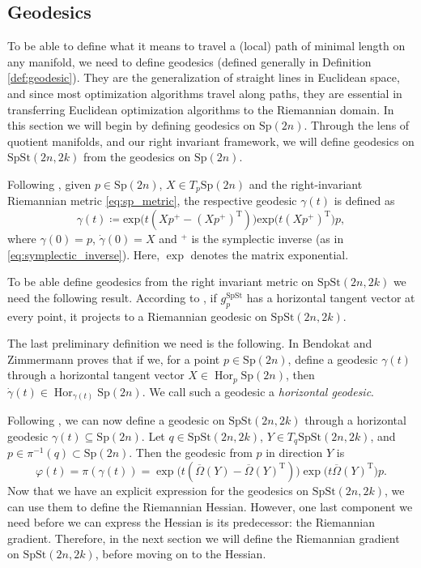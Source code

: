 \subsection{Geodesics}
To be able to define what it means to travel a (local) path of minimal length on any manifold, we need to define geodesics (defined generally in Definition \ref{def:geodesic}). They are the generalization of straight lines in Euclidean space, and since most optimization algorithms travel along paths, they are essential in transferring Euclidean optimization algorithms to the Riemannian domain. In this section we will begin by defining geodesics on $\mathrm{Sp}(2n)$. Through the lens of quotient manifolds, and our right invariant framework, we will define geodesics on $\mathrm{SpSt}(2n, 2k)$ from the geodesics on $\mathrm{Sp}(2n)$.

Following \cite[Prop.~2.1]{BendokatZimmermann2021}, given $p\in \mathrm{Sp}(2n)$,  $X\in T_{p}\mathrm{Sp}(2n)$ and the right-invariant Riemannian metric \eqref{eq:sp_metric}, the respective geodesic $\gamma(t)$ is defined as
\begin{equation*}
    \gamma(t)\coloneqq \mathrm{exp}\big(t(Xp^{+}-(Xp^{+}) ^{\mathrm{T}})\big)\mathrm{exp}\big(t(Xp^{+})^{\mathrm{T}}\big)p,
\end{equation*}
where $\gamma(0)=p$, $\dot{\gamma}(0)=X$ and $^{+}$ is the symplectic inverse (as in \eqref{eq:symplectic_inverse}). Here, $\operatorname{\exp}$ denotes the matrix exponential. 

To be able define geodesics from the right invariant metric on $\mathrm{SpSt}(2n, 2k)$ we need the following result. According to \cite[Cor.~7.46]{ONeill1983}, if $g_{p}^\mathrm{SpSt}$ has a horizontal tangent vector at every point, it projects to a Riemannian geodesic on $\mathrm{SpSt}(2n, 2k)$. 

The last preliminary definition we need is the following. In \cite[Lemma 3.11]{BendokatZimmermann2021} Bendokat and Zimmermann proves that if we, for a point $p \in \mathrm{Sp}(2n)$, define a geodesic $\gamma(t)$ through a horizontal tangent vector $X\in \operatorname{Hor}_{p}\mathrm{Sp}(2n)$, then $\dot{\gamma}(t)\in \operatorname{Hor}_{\gamma(t)}\mathrm{Sp}(2n)$. We call such a geodesic a \textit{horizontal geodesic}.

Following \cite[Prop. 3.12]{BendokatZimmermann2021}, we can now define a geodesic on $\mathrm{SpSt}(2n, 2k)$ through a horizontal geodesic $\gamma(t)\subseteq\mathrm{Sp}(2n)$. Let $q\in \mathrm{SpSt}(2n, 2k)$, $Y\in T_{q}\mathrm{SpSt}(2n, 2k)$, and $p\in \pi^{-1}(q)\subset \mathrm{Sp}(2n)$. Then the geodesic from $p$ in direction $Y$ is
%
\begin{equation}\label{eq:geodesic_spst}
\varphi(t)=\pi(\gamma(t))=\exp\big(t(\overline{\Omega}(Y)-\overline{\Omega}(Y)^{\mathrm{T}})\big)\exp\big(t \overline{\Omega}(Y)^{\mathrm{T}}\big)p.
\end{equation}
%
Now that we have an explicit expression for the geodesics on $\mathrm{SpSt}(2n, 2k)$, we can use them to define the Riemannian Hessian. However, one last component we need before we can express the Hessian is its predecessor: the Riemannian gradient. Therefore, in the next section we will define the Riemannian gradient on $\mathrm{SpSt}(2n, 2k)$, before moving on to the Hessian.